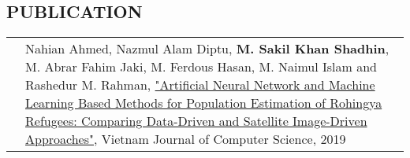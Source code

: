 \documentclass[10pt,twocolumn]{article}
\begin{document}

\subsection{PUBLICATION}
\begin{tabular}{>{\footnotesize\bfseries}r>{\footnotesize}p{}}
    & Nahian Ahmed, Nazmul Alam Diptu, \textbf{M. Sakil Khan Shadhin}, M. Abrar Fahim Jaki, M. Ferdous Hasan, M. Naimul Islam and Rashedur M. Rahman, \href{https://doi.org/10.1142/S2196888819500246}{"Artificial Neural Network and Machine Learning Based Methods for Population Estimation of Rohingya Refugees: Comparing Data-Driven and Satellite Image-Driven Approaches"}, Vietnam Journal of Computer Science, 2019
\end{tabular}
\end{document}
